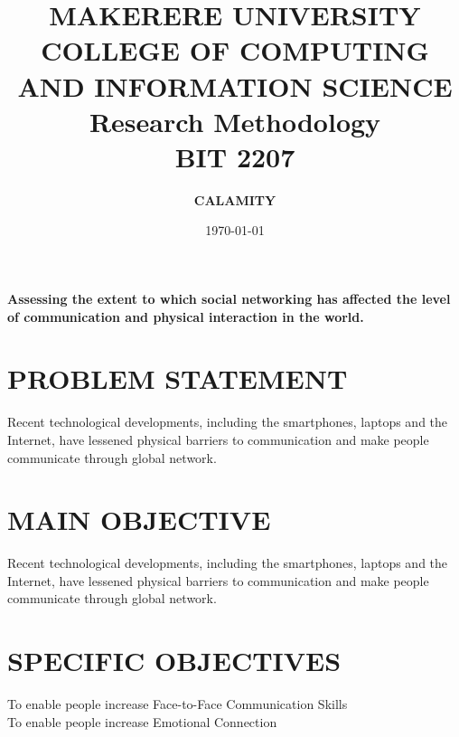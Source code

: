 \documentclass[a4paper,12pt]{article}
\begin{document}
\title{MAKERERE UNIVERSITY\\COLLEGE OF COMPUTING AND INFORMATION SCIENCE\\Research Methodology\\BIT 2207}
\author{\textbf{CALAMITY}}
\date{\today}
\maketitle

\tableofcontents
\newpage




{\LARGE {\textbf{Assessing the extent to which social networking has affected the level of communication and physical interaction in the world.}}}
\section{PROBLEM STATEMENT}
\textsf{Recent technological developments, including the smartphones, laptops and the Internet, have lessened physical barriers to communication and make people communicate through global network.}


\section{MAIN OBJECTIVE }
\textsf{Recent technological developments, including the smartphones, laptops and the Internet, have lessened physical barriers to communication and make people communicate through global network.}

\section{SPECIFIC OBJECTIVES}
\textsf{To enable people increase Face-to-Face Communication Skills\\
 To enable people increase Emotional Connection
}
\end{document}
